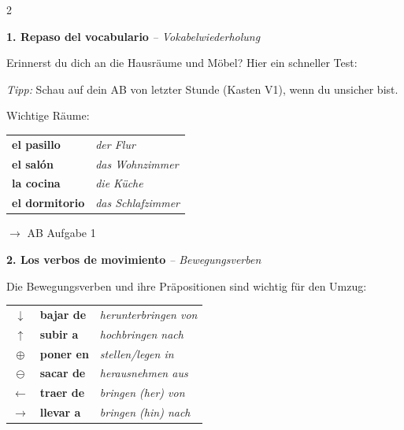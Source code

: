 \documentclass[11pt, a4paper]{article}
\newcommand{\seriftext}[1]{{\fontfamily{ppl}\selectfont #1}}
\newcommand{\es}[1]{\seriftext{\textbf{#1}}}
\newcommand{\de}[1]{\textit{\textcolor{akzent}{#1}}}
\newcommand{\abmark}[1]{{\footnotesize\textcolor{akzent}{$\rightarrow$ AB #1}}}
\newcommand{\abschnitt}[2]{\noindent\textbf{\large #1. #2}}
\begin{document}
\begin{multicols}{2}

\abschnitt{1}{Repaso del vocabulario} \de{-- Vokabelwiederholung}

\vspace{4pt}

Erinnerst du dich an die Hausräume und Möbel? Hier ein schneller Test:

\vspace{3pt}

\begin{tippbox}
\footnotesize\textit{Tipp:} Schau auf dein AB von letzter Stunde (Kasten V1), wenn du unsicher bist.
\end{tippbox}

\vspace{3pt}

{{\small Wichtige Räume:}}

\vspace{2pt}

{\footnotesize
\begin{tabular}{@{}ll@{}}
\es{el pasillo} & \de{der Flur} \\
\es{el salón} & \de{das Wohnzimmer} \\
\es{la cocina} & \de{die Küche} \\
\es{el dormitorio} & \de{das Schlafzimmer} \\
\end{tabular}}

\abmark{Aufgabe 1}

\vspace{8pt}

\abschnitt{2}{Los verbos de movimiento} \de{-- Bewegungsverben}

\vspace{4pt}

Die Bewegungsverben und ihre Präpositionen sind wichtig für den Umzug:

\begin{grammatikbox}
{\small
\begin{tabular}{@{}cll@{}}
$\downarrow$ & \es{bajar de} & \de{herunterbringen von} \\[0.3em]
$\uparrow$ & \es{subir a} & \de{hochbringen nach} \\[0.3em]
$\oplus$ & \es{poner en} & \de{stellen/legen in} \\[0.3em]
$\ominus$ & \es{sacar de} & \de{herausnehmen aus} \\[0.3em]
$\leftarrow$ & \es{traer de} & \de{bringen (her) von} \\[0.3em]
$\rightarrow$ & \es{llevar a} & \de{bringen (hin) nach} \\
\end{tabular}}
\end{grammatikbox}


\end{multicols}
\end{document}
